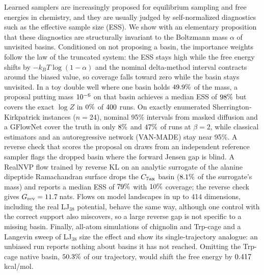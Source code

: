 Learned samplers are increasingly proposed for equilibrium sampling and free energies in chemistry, and they are usually judged by self-normalized diagnostics such as the effective sample size (ESS). We show with an elementary proposition that these diagnostics are structurally invariant to the Boltzmann mass $\alpha$ of unvisited basins. Conditioned on not proposing a basin, the importance weights follow the law of the truncated system: the ESS stays high while the free energy shifts by $-k_BT\log(1-\alpha)$ and the nominal delta-method interval contracts around the biased value, so coverage falls toward zero while the basin stays unvisited. In a toy double well where one basin holds $49.9\%$ of the mass, a proposal putting mass $10^{-6}$ on that basin achieves a median ESS of $98\%$ but covers the exact $\log Z$ in $0\%$ of $400$ runs. On exactly enumerated Sherrington-Kirkpatrick instances ($n=24$), nominal 95\% intervals from masked diffusion and a GFlowNet cover the truth in only $8\%$ and $47\%$ of runs at $\beta=2$, while classical estimators and an autoregressive network (VAN-MADE) stay near 95\%. A reverse check that scores the proposal on draws from an independent reference sampler flags the dropped basin where the forward Jensen gap is blind. A RealNVP flow trained by reverse KL on an analytic surrogate of the alanine dipeptide Ramachandran surface drops the $C_{7\rm ax}$ basin ($8.1\%$ of the surrogate's mass) and reports a median ESS of $79\%$ with $10\%$ coverage; the reverse check gives $G_{\rm rev}=11.7$\,nats. Flows on model landscapes in up to 414 dimensions, including the real LJ$_{38}$ potential, behave the same way, although one control with the correct support also miscovers, so a large reverse gap is not specific to a missing basin. Finally, all-atom simulations of chignolin and Trp-cage and a Langevin sweep of LJ$_{38}$ size the effect and show its single-trajectory analogue: an unbiased run reports nothing about basins it has not reached. Omitting the Trp-cage native basin, $50.3\%$ of our trajectory, would shift the free energy by $0.417$\,kcal/mol.